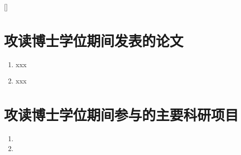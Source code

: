 
[]

\section{攻读博士学位期间发表的论文}
\begin{enumerate}
\item xxx

\item xxx
\end{enumerate}

\newpage
\section{攻读博士学位期间参与的主要科研项目}

\begin{enumerate}
    \item
    \item
\end{enumerate}

